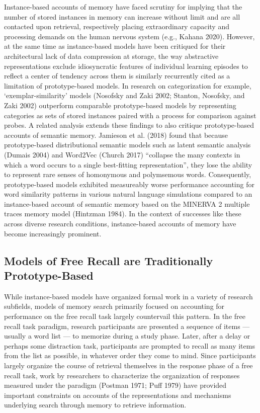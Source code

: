 \documentclass[
  letterpaper,
  DIV=11]{article}
\begin{document}
Instance-based accounts of memory have faced scrutiny for implying that
the number of stored instances in memory can increase without limit and
are all contacted upon retrieval, respectively placing extraordinary
capacity and processing demands on the human nervous system (e.g.,
Kahana 2020). However, at the same time as instance-based models have
been critiqued for their architectural lack of data compression at
storage, the way abstractive representations exclude idiosyncratic
features of individual learning episodes to reflect a center of tendency
across them is similarly recurrently cited as a limitation of
prototype-based models. In research on categorization for example,
`exemplar-similarity' models (Nosofsky and Zaki 2002; Stanton, Nosofsky,
and Zaki 2002) outperform comparable prototype-based models by
representing categories as sets of stored instances paired with a
process for comparison against probes. A related analysis extends these
findings to also critique prototype-based accounts of semantic memory.
Jamieson et al. (2018) found that because prototype-based distributional
semantic models such as latent semantic analysis (Dumais 2004) and
Word2Vec (Church 2017) ``collapse the many contexts in which a word
occurs to a single best-fitting representation'', they lose the ability
to represent rare senses of homonymous and polymsemous words.
Consequently, prototype-based models exhibited measureably worse
performance accounting for word similarity patterns in various natural
language simulations compared to an instance-based account of semantic
memory based on the MINERVA 2 multiple traces memory model (Hintzman
1984). In the context of successes like these across diverse research
conditions, instance-based accounts of memory have become increasingly
prominent.

\hypertarget{models-of-free-recall-are-traditionally-prototype-based}{%
\subsection{Models of Free Recall are Traditionally
Prototype-Based}\label{models-of-free-recall-are-traditionally-prototype-based}}

While instance-based models have organized formal work in a variety of
research subfields, models of memory search primarily focused on
accounting for performance on the free recall task largely countervail
this pattern. In the free recall task paradigm, research participants
are presented a sequence of items --- usually a word list --- to
memorize during a study phase. Later, after a delay or perhaps some
distraction task, participants are prompted to recall as many items from
the list as possible, in whatever order they come to mind. Since
participants largely organize the course of retrieval themselves in the
response phase of a free recall task, work by researchers to
characterize the organization of responses measured under the paradigm
(Postman 1971; Puff 1979) have provided important constraints on
accounts of the representations and mechanisms underlying search through
memory to retrieve information.
\end{document}
